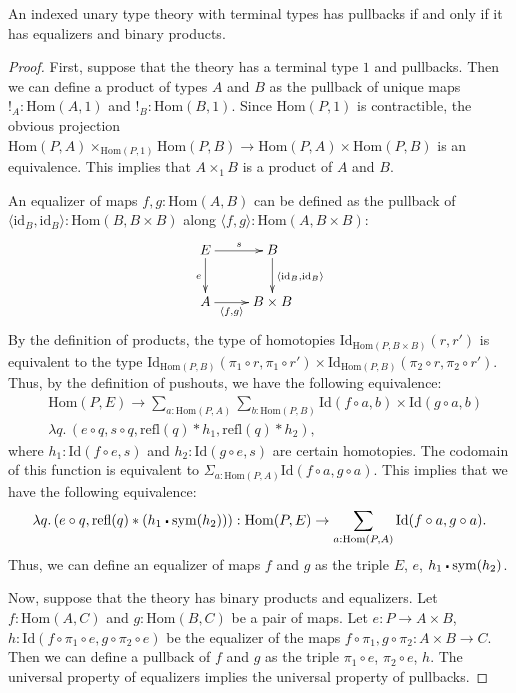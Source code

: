 \documentclass[reqno]{amsart}
\theoremstyle{definition}
\theoremstyle{remark}
\newcommand{\fs}[1]{\mathrm{#1}}
\newcommand{\Hom}{\fs{Hom}}
\newcommand{\Id}{\fs{Id}}
\newcommand{\refl}{\fs{refl}}
\newcommand{\sym}{\fs{sym}}
\newcommand{\id}{\fs{id}}
\numberwithin{figure}{section}
\newcommand{\ct}{%
  \mathchoice{\mathbin{\raisebox{0.25ex}{$\displaystyle\centerdot$}}}%
             {\mathbin{\raisebox{0.25ex}{$\centerdot$}}}%
             {\mathbin{\raisebox{0.25ex}{$\scriptstyle\,\centerdot\,$}}}%
             {\mathbin{\raisebox{0.25ex}{$\scriptscriptstyle\,\centerdot\,$}}}
}
\begin{document}
\begin{prop}
An indexed unary type theory with terminal types has pullbacks if and only if it has equalizers and binary products.
\end{prop}
\begin{proof}
First, suppose that the theory has a terminal type $1$ and pullbacks.
Then we can define a product of types $A$ and $B$ as the pullback of unique maps $!_A : \Hom(A,1)$ and $!_B : \Hom(B,1)$.
Since $\Hom(P,1)$ is contractible, the obvious projection $\Hom(P,A) \times_{\Hom(P,1)} \Hom(P,B) \to \Hom(P,A) \times \Hom(P,B)$ is an equivalence.
This implies that $A \times_1 B$ is a product of $A$ and $B$.

An equalizer of maps $f,g : \Hom(A,B)$ can be defined as the pullback of $\langle \id_B, \id_B \rangle : \Hom(B, B \times B)$ along $\langle f, g \rangle : \Hom(A, B \times B)$:
\[ \xymatrix{ E \ar[r]^s \ar[d]_e & B \ar[d]^{\langle \id_B, \id_B \rangle} \\
              A \ar[r]_-{\langle f, g \rangle} & B \times B
            } \]
By the definition of products, the type of homotopies $\Id_{\Hom(P, B \times B)}(r,r')$ is equivalent to the type $\Id_{\Hom(P,B)}(\pi_1 \circ r, \pi_1 \circ r') \times \Id_{\Hom(P,B)}(\pi_2 \circ r, \pi_2 \circ r')$.
Thus, by the definition of pushouts, we have the following equivalence:
\begin{align*}
& \Hom(P,E) \to \sum_{a : \Hom(P,A)} \sum_{b : \Hom(P,B)} \Id(f \circ a, b) \times \Id(g \circ a, b) \\
& \lambda q.\,(e \circ q, s \circ q, \refl(q) * h_1, \refl(q) * h_2),
\end{align*}
where $h_1 : \Id(f \circ e, s)$ and $h_2 : \Id(g \circ e, s)$ are certain homotopies.
The codomain of this function is equivalent to $\Sigma_{a : \Hom(P,A)} \Id(f \circ a, g \circ a)$.
This implies that we have the following equivalence:
\[ \lambda q.\,(e \circ q, \refl(q) * (h_1 \ct \sym(h_2))) : \Hom(P,E) \to \sum_{a : \Hom(P,A)} \Id(f \circ a, g \circ a). \]
Thus, we can define an equalizer of maps $f$ and $g$ as the triple $E$, $e$, $h_1 \ct \sym(h_2)$.

Now, suppose that the theory has binary products and equalizers.
Let $f : \Hom(A,C)$ and $g : \Hom(B,C)$ be a pair of maps.
Let $e : P \to A \times B$, $h : \Id(f \circ \pi_1 \circ e, g \circ \pi_2 \circ e)$ be the equalizer of the maps $f \circ \pi_1, g \circ \pi_2 : A \times B \to C$.
Then we can define a pullback of $f$ and $g$ as the triple $\pi_1 \circ e$, $\pi_2 \circ e$, $h$.
The universal property of equalizers implies the universal property of pullbacks.
\end{proof}
\end{document}
